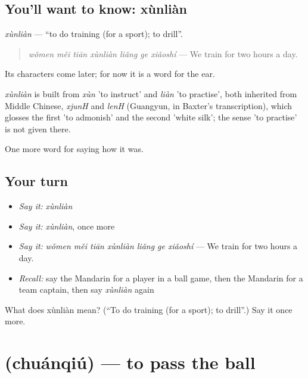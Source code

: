 \subsection*{You'll want to know: xùnliàn}
\emph{xùnliàn} — \textquotedblleft{}to do training (for a sport); to drill\textquotedblright{}.

\begin{quote}
\emph{wǒmen měi tiān xùnliàn liǎng ge xiǎoshí} — We train for two hours a day.
\end{quote}

Its characters come later; for now it is a word for the ear.

\begin{cousinweb}
\emph{xùnliàn} is built from \emph{xùn} 'to instruct' and \emph{liàn} 'to practise', both inherited from Middle Chinese, \emph{xjunH} and \emph{lenH} (Guangyun, in Baxter's transcription), which glosses the first 'to admonish' and the second 'white silk'; the sense 'to practise' is not given there.
\end{cousinweb}

\begin{grammarlens}[title={What you've built}]
One more word for saying how it was.
\end{grammarlens}

\subsection*{Your turn}
\begin{itemize}
\raggedright
  \item \emph{Say it:} \emph{xùnliàn}
  \item \emph{Say it:} \emph{xùnliàn}, once more
  \item \emph{Say it:} \emph{wǒmen měi tiān xùnliàn liǎng ge xiǎoshí} — We train for two hours a day.
  \item \emph{Recall:} say the Mandarin for a player in a ball game, then the Mandarin for a team captain, then say \emph{xùnliàn} again
\end{itemize}

\begin{tcolorbox}[breakable,colback=teal!4,colframe=teal!35!black,title={Before you move on}]
What does xùnliàn mean? (\textquotedblleft{}To do training (for a sport); to drill\textquotedblright{}.) Say it once more.
\end{tcolorbox}
\section[\texorpdfstring{\zh{传球} (chuánqiú)}{传球 (chuánqiú)}]{ (chuánqiú) — to pass the ball}


